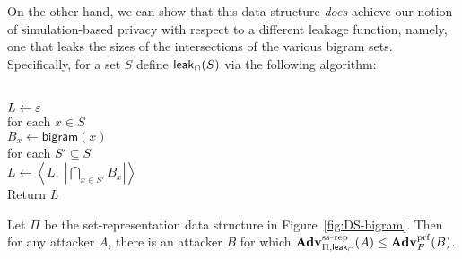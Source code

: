 
On the other hand, we can show that this data structure \emph{does}
achieve our notion of simulation-based privacy with respect to a
different leakage function, namely, one that leaks the sizes of the
intersections of the various bigram sets. Specifically, for a set
$S$ define ${\sf leak}_\cap(S)$ via the following algorithm:

\medskip\begin{center}
\\
$L \gets \varepsilon$\\
for each $x \in S$\\
\nudge $B_x \gets \mathsf{bigram}(x)$\\
for each $S' \subseteq S$\\
\nudge $L \gets \left\langle L, \; \left| \bigcap_{x \in S'} B_x \right| \right\rangle$\\
Return $L$
\end{center}



\begin{theorem} \label{thm:bi-ds-prf-priv-ss}
Let $\Pi$ be the set-representation data structure in
Figure~\ref{fig:DS-bigram}. Then for any attacker $A$, there is an
attacker $B$
for which
$\mathrm{\mathbf{Adv}}^{\mathrm{ss\mbox{-}rep}}_{\Pi,{\sf leak}_\cap}(A) \leq \mathbf{Adv}^{\mathrm{prf}}_{F}(B)$.
\end{theorem}

